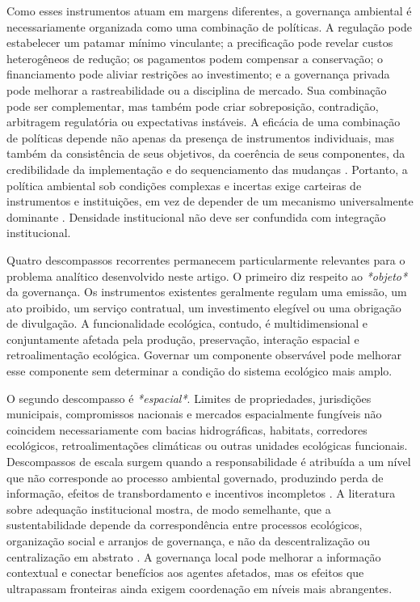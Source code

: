
Como esses instrumentos atuam em margens diferentes, a governança ambiental é necessariamente organizada como uma combinação de políticas. A regulação pode estabelecer um patamar mínimo vinculante; a precificação pode revelar custos heterogêneos de redução; os pagamentos podem compensar a conservação; o financiamento pode aliviar restrições ao investimento; e a governança privada pode melhorar a rastreabilidade ou a disciplina de mercado. Sua combinação pode ser complementar, mas também pode criar sobreposição, contradição, arbitragem regulatória ou expectativas instáveis. A eficácia de uma combinação de políticas depende não apenas da presença de instrumentos individuais, mas também da consistência de seus objetivos, da coerência de seus componentes, da credibilidade da implementação e do sequenciamento das mudanças \cite{rogge2016policy}. Portanto, a política ambiental sob condições complexas e incertas exige carteiras de instrumentos e instituições, em vez de depender de um mecanismo universalmente dominante \cite{sterner2019policy}. Densidade institucional não deve ser confundida com integração institucional.

Quatro descompassos recorrentes permanecem particularmente relevantes para o problema analítico desenvolvido neste artigo. O primeiro diz respeito ao \textit{*objeto*} da governança. Os instrumentos existentes geralmente regulam uma emissão, um ato proibido, um serviço contratual, um investimento elegível ou uma obrigação de divulgação. A funcionalidade ecológica, contudo, é multidimensional e conjuntamente afetada pela produção, preservação, interação espacial e retroalimentação ecológica. Governar um componente observável pode melhorar esse componente sem determinar a condição do sistema ecológico mais amplo.

O segundo descompasso é \textit{*espacial*}. Limites de propriedades, jurisdições municipais, compromissos nacionais e mercados espacialmente fungíveis não coincidem necessariamente com bacias hidrográficas, habitats, corredores ecológicos, retroalimentações climáticas ou outras unidades ecológicas funcionais. Descompassos de escala surgem quando a responsabilidade é atribuída a um nível que não corresponde ao processo ambiental governado, produzindo perda de informação, efeitos de transbordamento e incentivos incompletos \cite{cumming2006scale}. A literatura sobre adequação institucional mostra, de modo semelhante, que a sustentabilidade depende da correspondência entre processos ecológicos, organização social e arranjos de governança, e não da descentralização ou centralização em abstrato \cite{epstein2015fit}. A governança local pode melhorar a informação contextual e conectar benefícios aos agentes afetados, mas os efeitos que ultrapassam fronteiras ainda exigem coordenação em níveis mais abrangentes.

